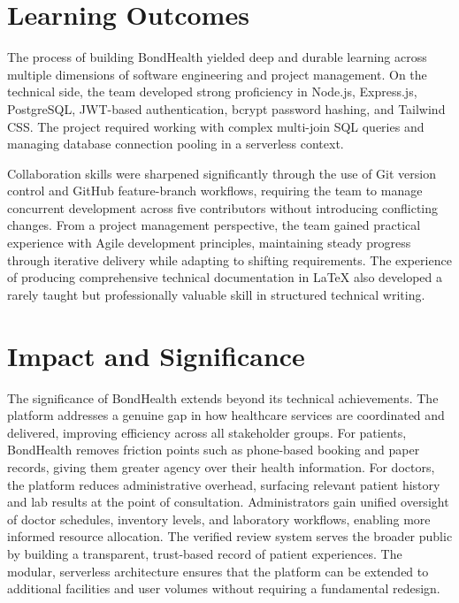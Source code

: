 \section{Learning Outcomes}

\noindent The process of building BondHealth yielded deep and durable learning across multiple dimensions of software engineering and project management. On the technical side, the team developed strong proficiency in Node.js, Express.js, PostgreSQL, JWT-based authentication, bcrypt password hashing, and Tailwind CSS. The project required working with complex multi-join SQL queries and managing database connection pooling in a serverless context.

\noindent Collaboration skills were sharpened significantly through the use of Git version control and GitHub feature-branch workflows, requiring the team to manage concurrent development across five contributors without introducing conflicting changes. From a project management perspective, the team gained practical experience with Agile development principles, maintaining steady progress through iterative delivery while adapting to shifting requirements. The experience of producing comprehensive technical documentation in LaTeX also developed a rarely taught but professionally valuable skill in structured technical writing.

\section{Impact and Significance}

\noindent The significance of BondHealth extends beyond its technical achievements. The platform addresses a genuine gap in how healthcare services are coordinated and delivered, improving efficiency across all stakeholder groups. For patients, BondHealth removes friction points such as phone-based booking and paper records, giving them greater agency over their health information. For doctors, the platform reduces administrative overhead, surfacing relevant patient history and lab results at the point of consultation. Administrators gain unified oversight of doctor schedules, inventory levels, and laboratory workflows, enabling more informed resource allocation. The verified review system serves the broader public by building a transparent, trust-based record of patient experiences. The modular, serverless architecture ensures that the platform can be extended to additional facilities and user volumes without requiring a fundamental redesign.

